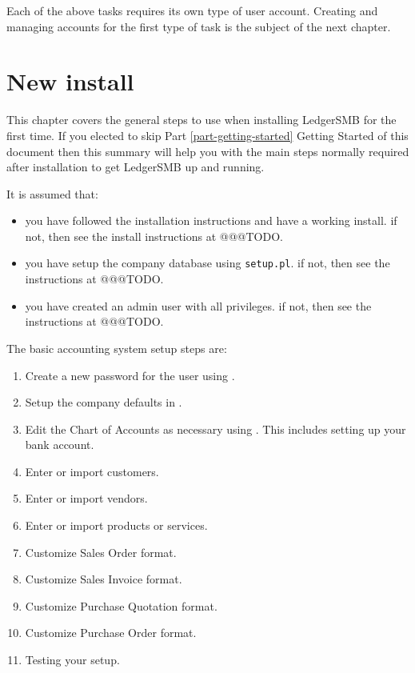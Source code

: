 Each of the above tasks requires its own type of user account. Creating and managing accounts
for the first type of task is the subject of the next chapter.

\chapter{New install}
\label{cha-new-install}

This chapter covers the general steps to use when installing LedgerSMB for the first time.
If you elected to skip Part \ref{part-getting-started} Getting Started of this document 
then this summary will
help you with the main steps normally required after installation to get LedgerSMB up and running. 

It is assumed that:
\begin{itemize}
        \item you have followed the installation instructions and have a working install.
        if not, then see the install instructions at @@@TODO.
        \item you have setup the company database using \texttt{setup.pl}.
        if not, then see the instructions at @@@TODO.
        \item  you have created an admin user with all privileges.
        if not, then see the instructions at @@@TODO.
\end{itemize} 

The basic accounting system setup steps are:

\begin{enumerate}
        \item Create a new password for the user using .
        \item Setup the company defaults in .
        \item Edit the Chart of Accounts as necessary using .
        This includes setting up your bank account.
        \item Enter or import customers.
        \item Enter or import vendors.
        \item Enter or import products or services.
        \item Customize Sales Order format.
        \item Customize Sales Invoice format.
        \item Customize Purchase Quotation format.
        \item Customize Purchase Order format.
        \item Testing your setup.
\end{enumerate}

